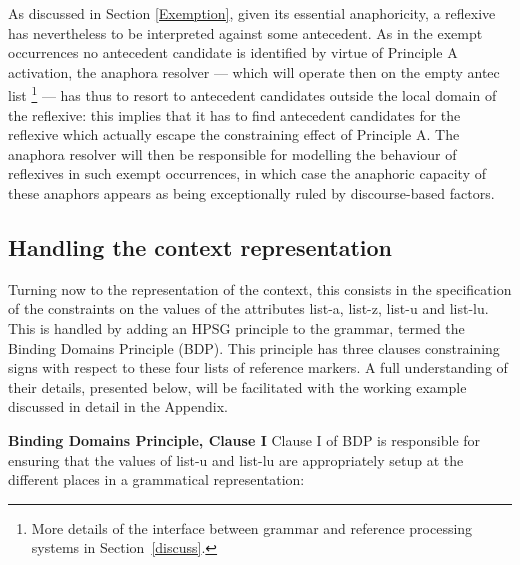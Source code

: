 \documentclass[output=paper
	        ,collection
	        ,collectionchapter
 	        ,biblatex
                ,babelshorthands
                ,newtxmath
                ,draftmode
                ,colorlinks, citecolor=brown
]{langscibook}
\begin{document}
As discussed in Section \ref{Exemption}, given its essential anaphoricity,
a reflexive has nevertheless to be interpreted against some
antecedent. As in the exempt occurrences no antecedent candidate is 
identified by virtue of Principle A activation, the
anaphora resolver --- which will operate then on the empty {\sc antec} list%
%
\footnote{ 
More details of the
interface between grammar and reference processing systems in Section~\ref{discuss}.}
%
--- has thus to resort
to antecedent candidates outside the local domain of the
reflexive: this implies that it has to find
antecedent candidates for the reflexive which actually escape 
the constraining effect of Principle A. The anaphora resolver will then be
responsible for modelling the behaviour of reflexives 
in such exempt occurrences, in which case the
anaphoric capacity of these anaphors appears as being
exceptionally ruled by discourse-based factors.


\subsection{Handling the context representation}\label{contextRep}

Turning now to the representation of the context, this consists in the 
specification of the constraints on the values of the
attributes {\sc list-a}, {\sc list-z}, {\sc list-u}  and {\sc list-lu}. 
This is handled by adding
an HPSG principle to the grammar, termed 
the Binding Domains Principle (BDP). 
This principle has three
clauses constraining signs with respect to these four lists of reference
markers. A full understanding of their details, presented below, will be 
facilitated with the working example discussed in detail in the Appendix.

\textbf{Binding Domains Principle, Clause I} Clause I of BDP is responsible for ensuring
that the values of {\sc list-u} and \mbox{{\sc list-lu}} are appropriately
setup at the different places in a grammatical representation:
\end{document}
